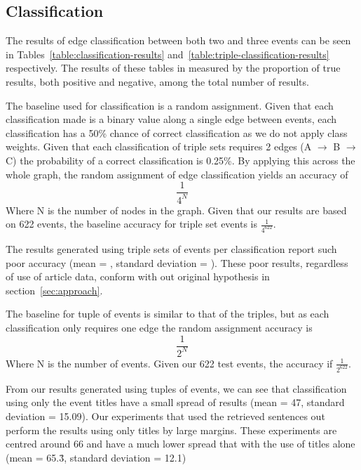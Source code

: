 \documentclass[bsc,frontabs,twoside,singlespacing,parskip,deptreport]{infthesis}     %
\begin{document}
\subsection{Classification}
The results of edge classification between both two and three events can be seen in Tables~\ref{table:classification-results}
and~\ref{table:triple-classification-results} respectively. The results of these tables in measured by the
proportion of true results, both positive and negative, among the total number of results.

The baseline used for classification is a random assignment.
Given that each classification made is a binary value along a single edge between events, each classification has a
50\% chance of correct classification as we do not apply class weights.
Given that each classification of triple sets requires 2 edges (A $\rightarrow$ B $\rightarrow$ C) the probability of a correct
classification is 0.25\%. By applying this across the whole graph, the random assignment of edge classification yields an
accuracy of
\begin{equation}
\frac{1}{4^N} \nonumber
\end{equation}
Where N is the number of nodes in the graph.
Given that our results are based on 622 events, the baseline accuracy for triple set events is $\frac{1}{4^{622}}$.

The results generated using triple sets of events per classification report such poor accuracy
(mean = , standard deviation = ). These poor results, regardless of use of article data,
conform with out original hypothesis in section~\ref{sec:approach}. 


The baseline for tuple of events is similar to that of the triples, but as each classification only requires one edge
the random assignment accuracy is
\begin{equation}
  \frac{1}{2^N}\nonumber
\end{equation}
Where N is the number of events.
Given our 622 test events, the accuracy if $\frac{1}{2^{622}}$.


From our results generated using tuples of events, we can see that classification using only the event titles
have a small spread of results (mean = 47, standard deviation = 15.09).
Our experiments that used the retrieved sentences out perform the results using only titles by large margins.
These experiments are centred around 66 and have a much lower spread that with the use of titles alone
(mean = 65.\.{3}, standard deviation = 12.1)
\end{document}
